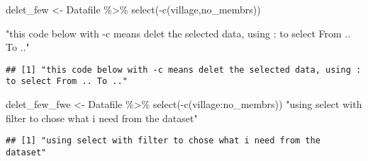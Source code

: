 \documentclass[
]{article}
\newenvironment{Shaded}{\begin{snugshade}}{\end{snugshade}}
\newcommand{\DecValTok}[1]{\textcolor[rgb]{0.00,0.00,0.81}{#1}}
\newcommand{\FunctionTok}[1]{\textcolor[rgb]{0.00,0.00,0.00}{#1}}
\newcommand{\NormalTok}[1]{#1}
\newcommand{\OtherTok}[1]{\textcolor[rgb]{0.56,0.35,0.01}{#1}}
\newcommand{\SpecialCharTok}[1]{\textcolor[rgb]{0.00,0.00,0.00}{#1}}
\newcommand{\StringTok}[1]{\textcolor[rgb]{0.31,0.60,0.02}{#1}}
\begin{document}
\begin{Shaded}
\begin{Highlighting}[]
\NormalTok{delet\_few }\OtherTok{\textless{}{-}}\NormalTok{ Datafile }\SpecialCharTok{\%\textgreater{}\%} 
  \FunctionTok{select}\NormalTok{(}\SpecialCharTok{{-}}\FunctionTok{c}\NormalTok{(village,no\_membrs))}

\StringTok{"this code below with {-}c means delet the selected data, using : to select From .. To .."}
\end{Highlighting}
\end{Shaded}

\begin{verbatim}
## [1] "this code below with -c means delet the selected data, using : to select From .. To .."
\end{verbatim}

\begin{Shaded}
\begin{Highlighting}[]
\NormalTok{delet\_few\_fwe }\OtherTok{\textless{}{-}}\NormalTok{ Datafile }\SpecialCharTok{\%\textgreater{}\%} 
  \FunctionTok{select}\NormalTok{(}\SpecialCharTok{{-}}\FunctionTok{c}\NormalTok{(village}\SpecialCharTok{:}\NormalTok{no\_membrs))}
\StringTok{"using select with filter to chose what i need from the dataset"}
\end{Highlighting}
\end{Shaded}

\begin{verbatim}
## [1] "using select with filter to chose what i need from the dataset"
\end{verbatim}

\begin{Shaded}
\end{Shaded}
\end{document}
